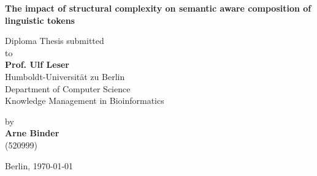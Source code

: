 \begin{center}

    {\Large{\bf The impact of structural complexity on semantic aware composition of linguistic tokens}} \vspace{0.5cm}


    {\normalsize Diploma Thesis submitted\\\vspace{0.5cm}
    to}\\\vspace{0.5cm}
    {\normalsize{\bf Prof. Ulf Leser}} \\\vspace{0.5cm}
    {\normalsize Humboldt-Universität zu Berlin \\
    Department of Computer Science \\
    Knowledge Management in Bioinformatics} \vspace{1cm}


    {\normalsize by \\\vspace{0.5cm}
    {\bf Arne Binder} \\
    (520999)} \vspace{1cm}


    {\normalsize Berlin, \today}

\end{center}
